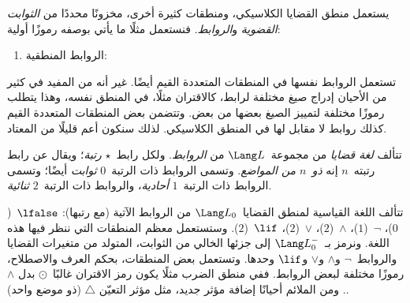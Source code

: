 \documentclass[../../../include/open-logic-section]{subfiles}
\begin{document}


يستعمل منطق القضايا الكلاسيكي، ومنطقات كثيرة أخرى، مخزونًا محددًا من
\emph{الثوابت القضوية} و\emph{الروابط}. فنستعمل مثلًا ما يأتي بوصفه
رموزًا أولية:
\begin{enumerate}
\item الروابط المنطقية:
  \startycommalist
\end{enumerate}

تستعمل الروابط نفسها في المنطقات المتعددة القيم أيضًا. غير أنه من
المفيد في كثير من الأحيان إدراج صيغ مختلفة لرابط، كالاقتران مثلًا،
في المنطق نفسه، وهذا يتطلب رموزًا مختلفة لتمييز الصيغ بعضها من بعض.
وتتضمن بعض المنطقات المتعددة القيم كذلك روابط لا مقابل لها في المنطق
الكلاسيكي. لذلك سنكون أعم قليلًا من المعتاد.

\begin{defn}
  تتألف \emph{لغة قضايا} من مجموعة~$\Lang L$ من \emph{الروابط}.
  ولكل رابط~$\star$ \emph{رتبة}؛ ويقال عن رابط رتبته~$n$ إنه
  \emph{ذو~$n$ من المواضع}. وتسمى الروابط ذات الرتبة~$0$
  \emph{ثوابت} أيضًا؛ وتسمى الروابط ذات الرتبة~$1$ \emph{أحادية}،
  والروابط ذات الرتبة~$2$ \emph{ثنائية}.
\end{defn}

\begin{ex}
  تتألف اللغة القياسية لمنطق القضايا~$\Lang L_0$ من الروابط الآتية
  (مع رتبها):
  $\lfalse$~($0$)،
  $\lnot$~($1$)،
  $\land$~($2$)،
  $\lor$~($2$)،
  $\lif$~($2$). وستستعمل معظم المنطقات التي ننظر فيها هذه اللغة.
  ونرمز بـ~$\Lang L_0^{-}$ إلى جزئها الخالي من الثوابت، المتولد من
  متغيرات القضايا والروابط~$\lnot$ و$\land$ و$\lor$ و$\lif$ وحدها.
  وتستعمل بعض المنطقات، بحكم العرف والاصطلاح، رموزًا مختلفة لبعض
  الروابط. ففي منطق الضرب مثلًا يكون رمز الاقتران غالبًا~$\odot$ بدل
  $\land$. ومن الملائم أحيانًا إضافة مؤثر جديد، مثل مؤثر التعيّن
  $\triangle$ (ذو موضع واحد).
\end{ex}
\end{document}
